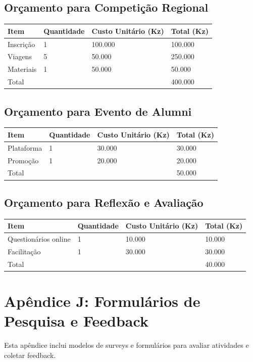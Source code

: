 \documentclass[12pt]{article}
\begin{document}
\subsection{Orçamento para Competição Regional}
\begin{longtable}{|l|l|l|l|}
\hline
Item & Quantidade & Custo Unitário (Kz) & Total (Kz) \\
\hline
Inscrição & 1 & 100.000 & 100.000 \\
Viagens & 5 & 50.000 & 250.000 \\
Materiais & 1 & 50.000 & 50.000 \\
\hline
Total & & & 400.000 \\
\hline
\end{longtable}

\subsection{Orçamento para Evento de Alumni}
\begin{longtable}{|l|l|l|l|}
\hline
Item & Quantidade & Custo Unitário (Kz) & Total (Kz) \\
\hline
Plataforma & 1 & 30.000 & 30.000 \\
Promoção & 1 & 20.000 & 20.000 \\
\hline
Total & & & 50.000 \\
\hline
\end{longtable}

\subsection{Orçamento para Reflexão e Avaliação}
\begin{longtable}{|l|l|l|l|}
\hline
Item & Quantidade & Custo Unitário (Kz) & Total (Kz) \\
\hline
Questionários online & 1 & 10.000 & 10.000 \\
Facilitação & 1 & 30.000 & 30.000 \\
\hline
Total & & & 40.000 \\
\hline
\end{longtable}

\clearpage
\section{Apêndice J: Formulários de Pesquisa e Feedback}

Esta apêndice inclui modelos de surveys e formulários para avaliar atividades e coletar feedback.
\end{document}
